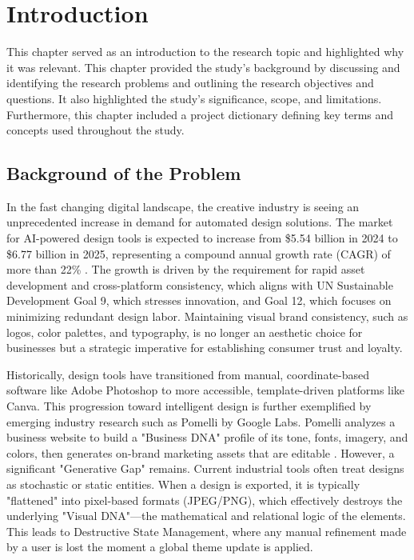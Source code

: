 
\chapter{Introduction}
\begin{refsection}

This chapter served as an introduction to the research topic and highlighted why it was relevant. This chapter provided the study’s background by discussing and identifying the research problems and outlining the research objectives and questions. It also highlighted the study’s significance, scope, and limitations. Furthermore, this chapter included a project dictionary defining key terms and concepts used throughout the study.

\section{Background of the Problem}

In the fast changing digital landscape, the creative industry is seeing an unprecedented increase in demand for automated design solutions. The market for AI-powered design tools is expected to increase from \$5.54 billion in 2024 to \$6.77 billion in 2025, representing a compound annual growth rate (CAGR) of more than 22\% \cite{BusinessResearch2025}. The growth is driven by the requirement for rapid asset development and cross-platform consistency, which aligns with UN Sustainable Development Goal 9, which stresses innovation, and Goal 12, which focuses on minimizing redundant design labor. Maintaining visual brand consistency, such as logos, color palettes, and typography, is no longer an aesthetic choice for businesses but a strategic imperative for establishing consumer trust and loyalty.

Historically, design tools have transitioned from manual, coordinate-based software like Adobe Photoshop to more accessible, template-driven platforms like Canva. This progression toward intelligent design is further exemplified by emerging industry research such as Pomelli by Google Labs. Pomelli analyzes a business website to build a "Business DNA" profile of its tone, fonts, imagery, and colors, then generates on-brand marketing assets that are editable \cite{GooglePomelli2025}. However, a significant "Generative Gap" remains. Current industrial tools often treat designs as stochastic or static entities. When a design is exported, it is typically "flattened" into pixel-based formats (JPEG/PNG), which effectively destroys the underlying "Visual DNA"—the mathematical and relational logic of the elements. This leads to Destructive State Management, where any manual refinement made by a user is lost the moment a global theme update is applied.


\end{refsection}
